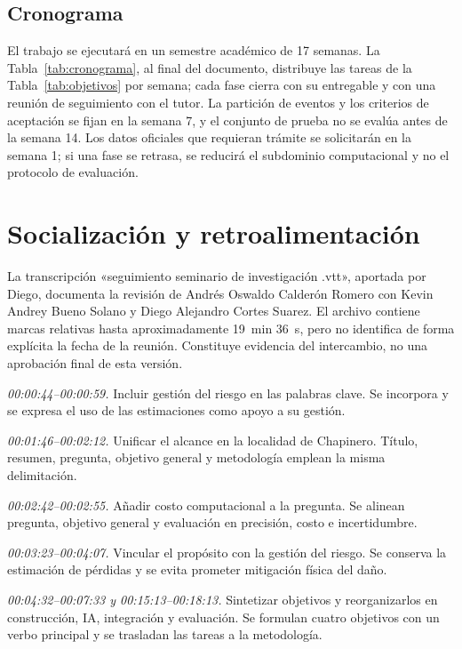 \documentclass[journal]{IEEEtran}
\begin{document}
\subsection{Cronograma}

El trabajo se ejecutará en un semestre académico de 17 semanas. La Tabla~\ref{tab:cronograma}, al final del documento, distribuye las tareas de la Tabla~\ref{tab:objetivos} por semana; cada fase cierra con su entregable y con una reunión de seguimiento con el tutor. La partición de eventos y los criterios de aceptación se fijan en la semana 7, y el conjunto de prueba no se evalúa antes de la semana 14. Los datos oficiales que requieran trámite se solicitarán en la semana 1; si una fase se retrasa, se reducirá el subdominio computacional y no el protocolo de evaluación.

\section{Socialización y retroalimentación}

La transcripción «seguimiento seminario de investigación .vtt», aportada por Diego, documenta la revisión de Andrés Oswaldo Calderón Romero con Kevin Andrey Bueno Solano y Diego Alejandro Cortes Suarez. El archivo contiene marcas relativas hasta aproximadamente 19~min 36~s, pero no identifica de forma explícita la fecha de la reunión. Constituye evidencia del intercambio, no una aprobación final de esta versión.

\textit{00:00:44--00:00:59.} Incluir gestión del riesgo en las palabras clave. Se incorpora y se expresa el uso de las estimaciones como apoyo a su gestión.

\textit{00:01:46--00:02:12.} Unificar el alcance en la localidad de Chapinero. Título, resumen, pregunta, objetivo general y metodología emplean la misma delimitación.

\textit{00:02:42--00:02:55.} Añadir costo computacional a la pregunta. Se alinean pregunta, objetivo general y evaluación en precisión, costo e incertidumbre.

\textit{00:03:23--00:04:07.} Vincular el propósito con la gestión del riesgo. Se conserva la estimación de pérdidas y se evita prometer mitigación física del daño.

\textit{00:04:32--00:07:33 y 00:15:13--00:18:13.} Sintetizar objetivos y reorganizarlos en construcción, IA, integración y evaluación. Se formulan cuatro objetivos con un verbo principal y se trasladan las tareas a la metodología.
\end{document}
